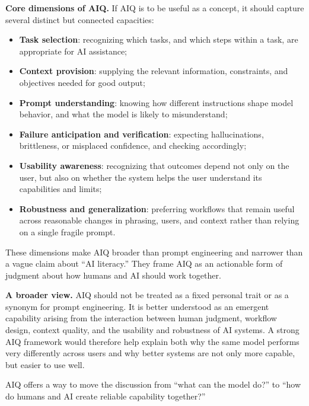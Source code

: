 \documentclass[10pt]{article}
\begin{document}
\textbf{Core dimensions of AIQ.}
If AIQ is to be useful as a concept, it should capture several distinct but connected capacities:
\begin{itemize}
\item \textbf{Task selection}: recognizing which tasks, and which steps within a task, are appropriate for AI assistance;
\item \textbf{Context provision}: supplying the relevant information, constraints, and objectives needed for good output;
\item \textbf{Prompt understanding}: knowing how different instructions shape model behavior, and what the model is likely to misunderstand;
\item \textbf{Failure anticipation and verification}: expecting hallucinations, brittleness, or misplaced confidence, and checking accordingly;
\item \textbf{Usability awareness}: recognizing that outcomes depend not only on the user, but also on whether the system helps the user understand its capabilities and limits;
\item \textbf{Robustness and generalization}: preferring workflows that remain useful across reasonable changes in phrasing, users, and context rather than relying on a single fragile prompt.
\end{itemize}
These dimensions make AIQ broader than prompt engineering and narrower than a vague claim about ``AI literacy.'' They frame AIQ as an actionable form of judgment about how humans and AI should work together.

\textbf{A broader view.}
AIQ should not be treated as a fixed personal trait or as a synonym for prompt engineering. It is better understood as an emergent capability arising from the interaction between human judgment, workflow design, context quality, and the usability and robustness of AI systems. A strong AIQ framework would therefore help explain both why the same model performs very differently across users and why better systems are not only more capable, but easier to use well.

\vfill
{\footnotesize
AIQ offers a way to move the discussion from ``what can the model do?'' to ``how do humans and AI create reliable capability together?''}
\end{document}
